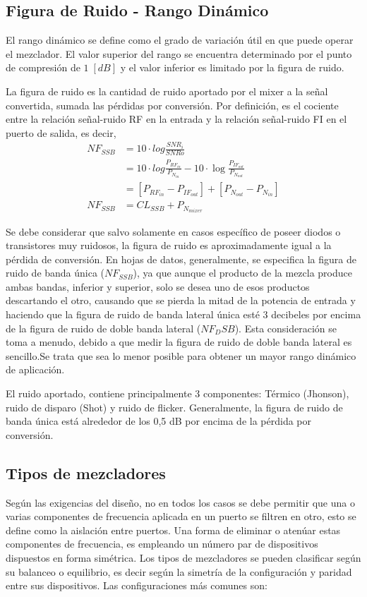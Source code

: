 \documentclass[twocolumn]{article}
\begin{document}
\subsection{Figura de Ruido - Rango Dinámico}
 El rango dinámico se define como el grado de variación útil en que puede operar el mezclador. El valor superior del rango se encuentra determinado por el punto de compresión de $1 \; [dB]$ y el valor inferior es limitado por la figura de ruido. 

La figura de ruido es la cantidad de ruido aportado por el mixer a la señal convertida, sumada las pérdidas por conversión. Por definición, es el cociente entre la relación señal-ruido RF en la entrada y la relación señal-ruido FI en el puerto de salida, es decir, 
\begin{align*}
NF_{SSB} &= 10 \cdot log{\frac{SNR_i}{SNRo}} \\
		 &= 10 \cdot log{\frac{P_{RF_{in}}}{P_{N_{in}}}} - 10 \cdot \log{\frac{P_{IF_{out}}}{P_{N_{out}}}} \\
		 &= [P_{RF_{in}} - P_{IF_{out}}] + [P_{N_{out}} - P_{N_{in}}] \\
NF_{SSB} &= CL_{SSB} + P_{N_{mixer}}
\end{align*}

Se debe considerar que salvo solamente en casos específico de poseer diodos o transistores muy ruidosos, la figura de ruido es aproximadamente igual a la pérdida de conversión. En hojas de datos, generalmente, se especifica la figura de ruido de banda única ($NF_{SSB}$), ya que aunque el producto de la mezcla produce ambas bandas, inferior y superior, solo se desea uno de esos productos descartando el otro, causando que se pierda la mitad de la potencia de entrada y haciendo que la figura de ruido de banda lateral única esté 3 decibeles por encima de la figura de ruido de doble banda lateral ($NF_DSB$). Esta consideración se toma a menudo, debido a que medir la figura de ruido de doble banda lateral es sencillo.Se trata que sea lo menor posible para obtener un mayor rango dinámico de aplicación.

El ruido aportado, contiene principalmente 3 componentes: Térmico (Jhonson), ruido de disparo (Shot) y ruido de flicker. Generalmente, la figura de ruido de banda única está alrededor de los 0,5 dB por encima de la pérdida por conversión.

\subsection{Tipos de mezcladores}  
Según las exigencias del diseño, no en todos los casos se debe permitir que una o varias componentes de frecuencia aplicada en un puerto se filtren en otro, esto se define como la aislación entre puertos. Una forma de eliminar o atenúar estas componentes de frecuencia, es empleando un número par de dispositivos dispuestos en forma simétrica. Los tipos de mezcladores se pueden clasificar según su balanceo o equilibrio, es decir según la simetría de la configuración y paridad entre sus dispositivos. Las configuraciones más comunes son:
\end{document}
